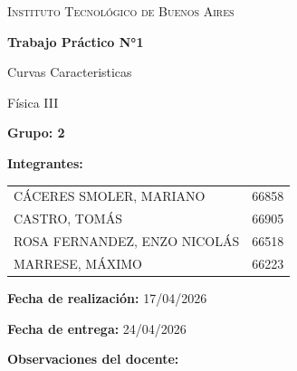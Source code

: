\begin{titlepage}
    \centering

    \vspace{3cm}

    {\scshape\LARGE Instituto Tecnológico de Buenos Aires \par}
    \vspace{2cm}

    {\Huge\bfseries Trabajo Práctico N°1 \par}
    \vspace{0.5cm}
    {\Large Curvas Caracteristicas \par}
    \vspace{0.5cm}
    {\large Física III \par}

    \vspace{4cm}

    \begin{flushleft}
    {\Large\textbf{Grupo: 2}\par}
    \vspace{0.5cm}

    {\Large\textbf{Integrantes:}\par}
    \vspace{0.3cm}
    \begin{tabular}{l r}
        CÁCERES SMOLER, MARIANO      & 66858 \\
        CASTRO, TOMÁS                & 66905 \\
        ROSA FERNANDEZ, ENZO NICOLÁS & 66518 \\
        MARRESE, MÁXIMO              & 66223 \\
    \end{tabular}
    \end{flushleft}

    \vfill

    \begin{flushleft}
    {\large \textbf{Fecha de realización:} 17/04/2026\par}
    {\large \textbf{Fecha de entrega:} 24/04/2026\par}
    \end{flushleft}

    \vspace{0.6cm}

    \begin{flushleft}
    {\large\textbf{Observaciones del docente:}}\par
    \vspace{0.2cm}
    \framebox[\linewidth]{\rule{0pt}{3cm}}


\end{flushleft}
\end{titlepage}
